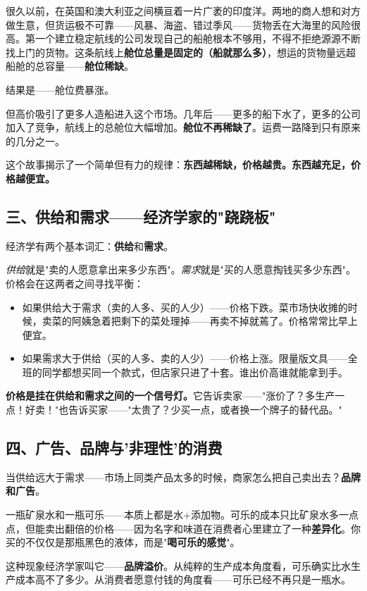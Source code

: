 \documentclass[a4paper,12pt]{ctexart}
\begin{document}
很久以前，在英国和澳大利亚之间横亘着一片广袤的印度洋。两地的商人想和对方做生意，但货运极不可靠——风暴、海盗、错过季风——货物丢在大海里的风险很高。第一个建立稳定航线的公司发现自己的船舱根本不够用，不得不拒绝源源不断找上门的货物。这条航线上\textbf{舱位总量是固定的（船就那么多）}，想运的货物量远超船舱的总容量——\textbf{舱位稀缺}。

结果是——舱位费暴涨。

但高价吸引了更多人造船进入这个市场。几年后——更多的船下水了，更多的公司加入了竞争，航线上的总舱位大幅增加。\textbf{舱位不再稀缺了}。运费一路降到只有原来的几分之一。

这个故事揭示了一个简单但有力的规律：\textbf{东西越稀缺，价格越贵。东西越充足，价格越便宜。}

\subsection*{三、供给和需求——经济学家的"跷跷板"}

经济学有两个基本词汇：\textbf{供给}和\textbf{需求}。

\textit{供给}就是"卖的人愿意拿出来多少东西"。\textit{需求}就是"买的人愿意掏钱买多少东西"。价格会在这两者之间寻找平衡：

\begin{itemize}
  \item 如果供给大于需求（卖的人多、买的人少）——价格下跌。菜市场快收摊的时候，卖菜的阿姨急着把剩下的菜处理掉——再卖不掉就蔫了。价格常常比早上便宜。
  \item 如果需求大于供给（买的人多、卖的人少）——价格上涨。限量版文具——全班的同学都想买同一个款式，但店家只进了十套。谁出价高谁就能拿到手。
\end{itemize}

\textbf{价格是挂在供给和需求之间的一个信号灯。}它告诉卖家——"涨价了？多生产一点！好卖！"也告诉买家——"太贵了？少买一点，或者换一个牌子的替代品。"

\subsection*{四、广告、品牌与'非理性'的消费}

当供给远大于需求——市场上同类产品太多的时候，商家怎么把自己卖出去？\textbf{品牌和广告}。

一瓶矿泉水和一瓶可乐——本质上都是水+添加物。可乐的成本只比矿泉水多一点点，但能卖出翻倍的价格——因为名字和味道在消费者心里建立了一种\textbf{差异化}。你买的不仅仅是那瓶黑色的液体，而是"\textbf{喝可乐的感觉}"。

这种现象经济学家叫它——\textbf{品牌溢价}。从纯粹的生产成本角度看，可乐确实比水生产成本高不了多少。从消费者愿意付钱的角度看——可乐已经不再只是一瓶水。
\end{document}

